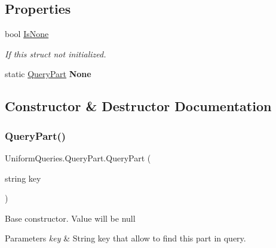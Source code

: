 \subsection*{Properties}
\begin{DoxyCompactItemize}
\item 
bool \mbox{\hyperlink{struct_uniform_queries_1_1_query_part_af380375ca82e9dc2eecf899b5933fe2b}{Is\+None}}
\begin{DoxyCompactList}\small\item\em If this struct not initialized. \end{DoxyCompactList}\item 
\mbox{\label{struct_uniform_queries_1_1_query_part_a5be54faa8b7723167257e930a71457a4}} 
static \mbox{\hyperlink{struct_uniform_queries_1_1_query_part}{Query\+Part}} {\bfseries None}
\end{DoxyCompactItemize}


\subsection{Constructor \& Destructor Documentation}
\mbox{\label{struct_uniform_queries_1_1_query_part_ae8a918635c52a837300ff3b1fdcdfd57}} 
\subsubsection{\texorpdfstring{Query\+Part()}{QueryPart()}\hspace{0.1cm}{\footnotesize\ttfamily [1/2]}}
{\footnotesize\ttfamily Uniform\+Queries.\+Query\+Part.\+Query\+Part (\begin{DoxyParamCaption}\item[{string}]{key }\end{DoxyParamCaption})}



Base constructor. Value will be null 


\begin{DoxyParams}{Parameters}
{\em key} & String key that allow to find this part in query.\\
\hline
\end{DoxyParams}
\mbox{\label{struct_uniform_queries_1_1_query_part_adabbcaa15ccf653f686d4f2bcd39ce09}} 
